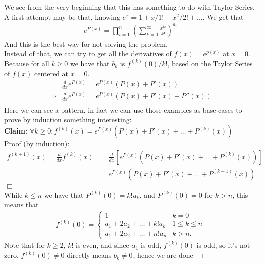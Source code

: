 \begin{solution}
    We see from the very beginning that this has something to do with Taylor Series. A first attempt may be that, knowing $e^x=1+x/1!+x^2/2!+...$. We get that
    \begin{align*}
        e^{P(x)} = \prod_{i=1}^n \left(\sum_{k=0}^{\infty} \frac{x^{ik}}{k!} \right)^{a_i}
    \end{align*}
    And this is the best way for not solving the problem.\\
    Instead of that, we can try to get all the derivatives of $f(x)=e^{p(x)}$ at $x=0$. Because for all $k \geq 0$ we have that $b_k$ is $f^{(k)}(0)/k!$, based on the Taylor Series of $f(x)$ centered at $x=0$.\\
    
    \begin{align*}
        &\frac{d}{dx} e^{P(x)} = e^{P(x)} \left(P(x)+ P'(x) \right)\\
        \Rightarrow &\frac{d}{dx} e^{P(x)} = e^{P(x)} \left(P(x)+ P'(x) + P''(x)\right)\\
    \end{align*}
    Here we can see a pattern, in fact we can use those examples as base cases to prove by induction something interesting:\vspace{12pt} \\
    \textbf{Claim: }  $\forall k \geq 0: f^{(k)}(x) = e^{P(x)}(P(x)+P'(x)+\ldots+P^{(k)}(x))$\\
    Proof (by induction):
    \begin{align*}
        f^{(k+1)}(x) = \frac{d}{dx}f^{(k)}(x) =& \frac{d}{dx} \left[ e^{P(x)}\left (P(x)+P'(x)+\ldots+P^{(k)}(x) \right) \right] \\
        =& e^{P(x)}\left (P(x)+P'(x)+\ldots+P^{(k+1)}(x) \right) \\
        \Box
    \end{align*}
    While $k \leq n$ we have that $P^{(k)}(0)=k!a_k$, and $P^{(k)}(0)=0$ for $k > n$, this means that 
    \begin{align*}
        f^{(k)}(0) =
        \begin{cases} 
            1 & k=0\\
            a_1+2a_2+\ldots+k!a_k &  1\leq k \leq n \\ 
            a_1+2a_2+\ldots+n!a_n &  k > n.
        \end{cases}
    \end{align*}
    Note that for $k\geq 2$, $k!$ is even, and since $a_1$ is odd, $f^{(k)}(0)$ is odd, so it's not zero. $f^{(k)}(0) \neq 0$ directly means $b_k \neq 0$, hence we are done $\Box$
\end{solution}

